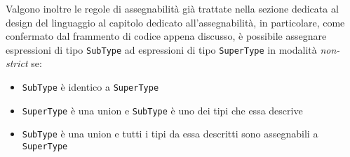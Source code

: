 Valgono inoltre le regole di assegnabilità già trattate nella sezione dedicata al design del linguaggio al 
capitolo dedicato all'assegnabilità, in particolare, come confermato dal frammento di codice appena discusso, 
è possibile assegnare espressioni di tipo \texttt{SubType} ad espressioni di tipo \texttt{SuperType} in modalità 
\textit{non-strict} se: \\

\begin{itemize}
    \item \texttt{SubType} è identico a \texttt{SuperType}
    \item \texttt{SuperType} è una union e \texttt{SubType} è uno dei tipi che essa descrive
    \item \texttt{SubType} è una union e tutti i tipi da essa descritti sono assegnabili a \texttt{SuperType}    
\end{itemize}